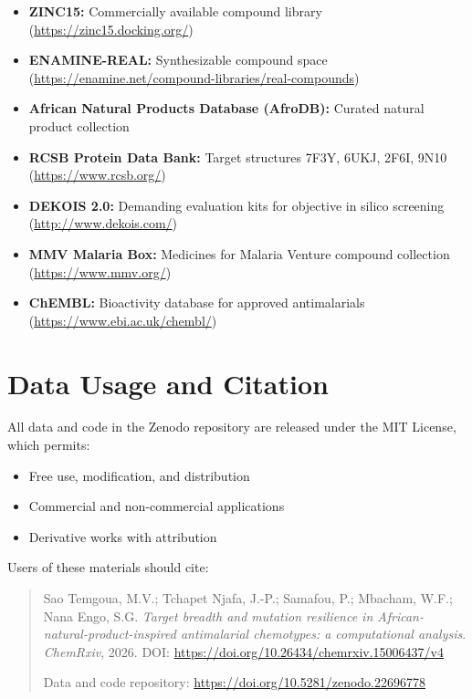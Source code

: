 \documentclass[11pt,a4paper]{article}
\begin{document}
\begin{itemize}[leftmargin=*]
\item \textbf{ZINC15:} Commercially available compound library (\url{https://zinc15.docking.org/})
\item \textbf{ENAMINE-REAL:} Synthesizable compound space (\url{https://enamine.net/compound-libraries/real-compounds})
\item \textbf{African Natural Products Database (AfroDB):} Curated natural product collection
\item \textbf{RCSB Protein Data Bank:} Target structures 7F3Y, 6UKJ, 2F6I, 9N10 (\url{https://www.rcsb.org/})
\item \textbf{DEKOIS 2.0:} Demanding evaluation kits for objective in silico screening (\url{http://www.dekois.com/})
\item \textbf{MMV Malaria Box:} Medicines for Malaria Venture compound collection (\url{https://www.mmv.org/})
\item \textbf{ChEMBL:} Bioactivity database for approved antimalarials (\url{https://www.ebi.ac.uk/chembl/})
\end{itemize}

\section*{Data Usage and Citation}

All data and code in the Zenodo repository are released under the MIT License, which permits:

\begin{itemize}[leftmargin=*]
\item Free use, modification, and distribution
\item Commercial and non-commercial applications
\item Derivative works with attribution
\end{itemize}

Users of these materials should cite:

\begin{quote}
Sao Temgoua, M.V.; Tchapet Njafa, J.-P.; Samafou, P.; Mbacham, W.F.; Nana Engo, S.G. \textit{Target breadth and mutation resilience in African-natural-product-inspired antimalarial chemotypes: a computational analysis}. \emph{ChemRxiv}, 2026. DOI: \url{https://doi.org/10.26434/chemrxiv.15006437/v4}

Data and code repository: \url{https://doi.org/10.5281/zenodo.22696778}
\end{quote}
\end{document}
